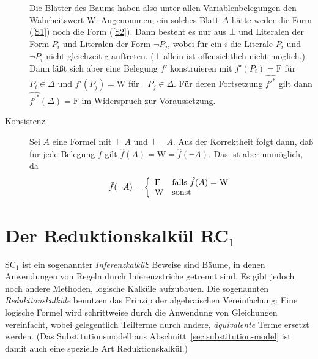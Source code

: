 \begin{beweis}
\begin{description}
    Die Blätter des Baums haben also unter allen Variablenbelegungen den
    Wahrheitswert $\mathrm{W}$.  Angenommen, ein solches Blatt $\Delta$ hätte weder die
    Form (\ref{S1}) noch die Form (\ref{S2}).  Dann besteht es nur aus $\bot$
    und Literalen der Form $P_i$ und Literalen der Form $\neg P_j$, wobei
    für ein $i$ die Literale $P_i$ und $\neg P_i$ nicht gleichzeitig auftreten.
    ($\bot$ allein ist offensichtlich nicht möglich.)  Dann läßt sich aber eine
    Belegung $f'$ konstruieren mit $f'(P_i) = \mathrm{F}$ für
    $P_i\in \Delta$ und $f'(P_j) = \mathrm{W}$ für
    $\neg P_j\in \Delta$.  Für deren Fortsetzung $\widehat{\mbox{$f'$}^*}$ gilt dann
    $\widehat{\mbox{$f'$}^*}(\Delta)=\mathrm{F}$ im Widerspruch zur Voraussetzung.
  \item[Konsistenz] Sei $A$ eine Formel mit $\vdash A$ und $\vdash
    \neg A$.  Aus der Korrektheit folgt dann, daß für jede
    Belegung $f$ gilt ${\hat{f}}(A) = \mathrm{W} =
    {\hat{f}}(\neg A)$.  Das ist aber unmöglich, da 
    \[{\hat{f}}(\neg A)
    = \left\{\begin{array}{ll}
        \mathrm{F} & \mbox{\rm falls\ }{\hat{f}}(A)=\mathrm{W}\\
        \mathrm{W} & \mbox{\rm sonst}
      \end{array}\right.\]
    \end{description}
\end{beweis}
  

\section{Der Reduktionskalkül RC$_1$}
\label{sec:rc1}

SC$_1$ ist ein sogenannter \textit{Inferenzkalkül}: Beweise sind Bäume, in
denen Anwendungen von Regeln durch Inferenzstriche getrennt sind.  Es gibt
jedoch noch andere Methoden, logische Kalküle aufzubauen.  Die sogenannten
\textit{Reduktionskalküle} benutzen das Prinzip der algebraischen
Vereinfachung: Eine logische Formel wird schrittweise durch die Anwendung von
Gleichungen vereinfacht, wobei gelegentlich Teilterme durch andere, 
\emph{äquivalente} Terme ersetzt werden.  %
(Das Substitutionsmodell aus Abschnitt~\ref{sec:substitution-model}
ist damit auch eine spezielle Art Reduktionskalkül.)

